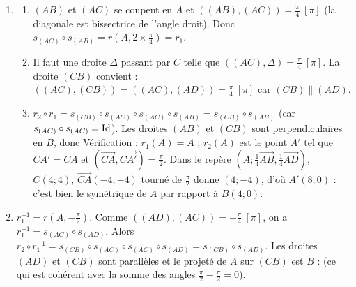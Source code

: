\begin{corrige}
\begin{sol}
\begin{enumerate}
            Les diagonales $(AC)$ et $(BD)$ se coupent en $O$ et sont perpendiculaires : $((AC),(BD)) = \frac{\pi}{2}\ [\pi]$, donc
            $s_{(BD)} \circ s_{(AC)} = r(O, \pi)$ : 
      \item \begin{enumerate}
                  \item $(AB)$ et $(AC)$ se coupent en $A$ et $((AB),(AC)) = \frac{\pi}{4}\ [\pi]$ (la diagonale est bissectrice de l'angle droit).
                        Donc $s_{(AC)} \circ s_{(AB)} = r\left(A, 2 \times \frac{\pi}{4}\right) = r_1$.
                  \item Il faut une droite $\Delta$ passant par $C$ telle que $((AC),\Delta) = \frac{\pi}{4}\ [\pi]$.
                        La droite $(CB)$ convient : $((AC),(CB)) = ((AC),(AD)) = \frac{\pi}{4}\ [\pi]$ car $(CB) \parallel (AD)$.
                  \item $r_2 \circ r_1 = s_{(CB)} \circ s_{(AC)} \circ s_{(AC)} \circ s_{(AB)} = s_{(CB)} \circ s_{(AB)}$ (car $s_{(AC)} \circ s_{(AC)} = \mathrm{Id}$).
                        Les droites $(AB)$ et $(CB)$ sont perpendiculaires en $B$, donc
                        Vérification : $r_1(A) = A$ ; $r_2(A)$ est le point $A'$ tel que $CA' = CA$ et $(\overrightarrow{CA},\overrightarrow{CA'}) = \frac{\pi}{2}$.
                        Dans le repère $(A;\frac14\overrightarrow{AB},\frac14\overrightarrow{AD})$, $C(4;4)$, $\overrightarrow{CA}(-4;-4)$ tourné de $\frac{\pi}{2}$ donne $(4;-4)$,
                        d'où $A'(8;0)$ : c'est bien le symétrique de $A$ par rapport à $B(4;0)$.
            \end{enumerate}
      \item $r_1^{-1} = r(A,-\frac{\pi}{2})$. Comme $((AD),(AC)) = -\frac{\pi}{4}\ [\pi]$, on a $r_1^{-1} = s_{(AC)} \circ s_{(AD)}$.
            Alors $r_2 \circ r_1^{-1} = s_{(CB)} \circ s_{(AC)} \circ s_{(AC)} \circ s_{(AD)} = s_{(CB)} \circ s_{(AD)}$.
            Les droites $(AD)$ et $(CB)$ sont parallèles et le projeté de $A$ sur $(CB)$ est $B$ :
             (ce qui est cohérent avec la somme des angles $\frac{\pi}{2} - \frac{\pi}{2} = 0$).
\end{enumerate}
\end{sol}
\begin{sol}

\end{sol}
\end{corrige}
